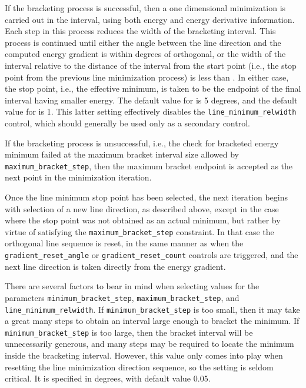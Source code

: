 \begin{description}
If the bracketing process is successful, then a one dimensional
minimization is carried out in the interval, using both energy and
energy derivative information.  Each step in this process reduces the
width of the bracketing interval.  This process is continued until
either the angle between the line direction and the computed energy
gradient is within  degrees of
orthogonal, or the width of the interval relative to the distance of the
interval from the start point (i.e., the stop point from the previous
line minimization process) is less than
.  In either case, the stop point,
i.e., the effective minimum, is taken to be the endpoint of the final
interval having smaller energy.  The default value for
 is 5 degrees, and the default value for
 is 1.  This latter setting effectively disables the
\texttt{line\_minimum\_relwidth} control, which should generally be used
only as a secondary control.

If the bracketing process is unsuccessful, i.e., the check for bracketed
energy minimum failed at the maximum bracket interval size allowed by
\texttt{maximum\_bracket\_step}, then the maximum bracket endpoint is
accepted as the next point in the minimization iteration.

Once the line minimum stop point has been selected, the next iteration
begins with selection of a new line direction, as described above,
except in the case where the stop point was not obtained as an actual
minimum, but rather by virtue of satisfying the
\texttt{maximum\_bracket\_step} constraint.  In that case the orthogonal
line sequence is reset, in the same manner as when the
\texttt{gradient\_reset\_angle} or \texttt{gradient\_reset\_count}
controls are triggered, and the next line direction is taken directly
from the energy gradient.

There are several factors to bear in mind when selecting values for
the parameters \texttt{minimum\_bracket\_step},
\texttt{maximum\_bracket\_step}, and \texttt{line\_minimum\_relwidth}.
If \texttt{minimum\_bracket\_step} is too small, then it may take a
great many steps to obtain an interval large enough to bracket the
minimum.  If \texttt{minimum\_bracket\_step} is too large, then the
bracket interval will be unnecessarily generous, and many steps may be
required to locate the minimum inside the bracketing interval.  However,
this value only comes into play when resetting the line minimization
direction sequence, so the setting is seldom critical.  It is specified
in degrees, with default value 0.05.


\end{description}
